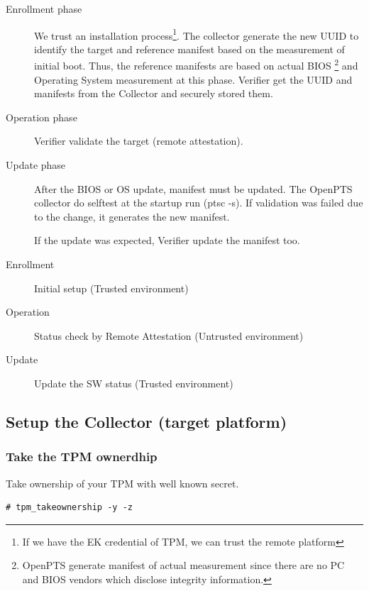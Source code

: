 \begin{description}
\item[Enrollment phase]
We trust an installation process\footnote{If we have the EK credential of TPM, we can trust the remote platform}.
The collector generate the new UUID to identify the target and reference manifest based on the measurement of initial boot.
Thus, the reference manifests are based on actual BIOS
\footnote{OpenPTS generate manifest of actual measurement since there are no PC and BIOS vendors which disclose integrity information.}
and Operating System measurement at this phase. Verifier get the UUID and manifests from the Collector and securely stored them.

\item[Operation phase]
Verifier validate the target (remote attestation).

\item[Update phase]
After the BIOS or OS update, manifest must be updated.
The OpenPTS collector do selftest at the startup run (ptsc -s).
If validation was failed due to the change, it generates the new manifest.

If the update was expected, Verifier update the manifest too.

\end{description}

\begin{description}
 \item[Enrollment]  Initial setup (Trusted environment)
 \item[Operation]   Status check by Remote Attestation (Untrusted environment)
 \item[Update]      Update the SW status (Trusted environment)
\end{description}

\subsection{Setup the Collector (target platform)}

\subsubsection{Take the TPM ownerdhip}

Take ownership of your TPM with well known secret.

\begin{lstlisting}[style=console] 
# tpm_takeownership -y -z
\end{lstlisting}

